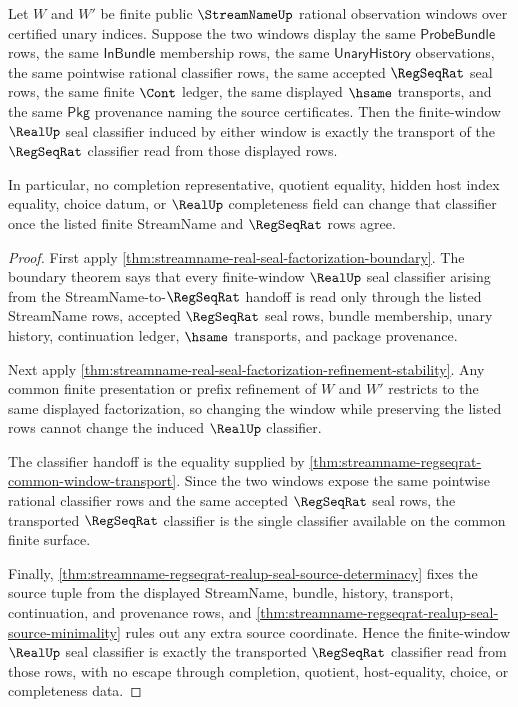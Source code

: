 \begin{theorem}
\label{thm:streamname-real-seal-finite-window-classifier-exactness}
Let $W$ and $W'$ be finite public $\StreamNameUp$ rational observation windows
over certified unary indices. Suppose the two windows display the same
$\mathsf{ProbeBundle}$ rows, the same $\mathsf{InBundle}$ membership rows, the
same $\mathsf{UnaryHistory}$ observations, the same pointwise rational
classifier rows, the same accepted $\RegSeqRat$ seal rows, the same finite
$\Cont$ ledger, the same displayed $\hsame$ transports, and the same
$\mathsf{Pkg}$ provenance naming the source certificates. Then the
finite-window $\RealUp$ seal classifier induced by either window is exactly the
transport of the $\RegSeqRat$ classifier read from those displayed rows.

In particular, no completion representative, quotient equality, hidden host
index equality, choice datum, or $\RealUp$ completeness field can change that
classifier once the listed finite StreamName and $\RegSeqRat$ rows agree.
\end{theorem}
\begin{proof}
First apply
\autoref{thm:streamname-real-seal-factorization-boundary}. The boundary
theorem says that every finite-window $\RealUp$ seal classifier arising from
the StreamName-to-$\RegSeqRat$ handoff is read only through the listed
StreamName rows, accepted $\RegSeqRat$ seal rows, bundle membership, unary
history, continuation ledger, $\hsame$ transports, and package provenance.

Next apply
\autoref{thm:streamname-real-seal-factorization-refinement-stability}. Any
common finite presentation or prefix refinement of $W$ and $W'$ restricts to
the same displayed factorization, so changing the window while preserving the
listed rows cannot change the induced $\RealUp$ classifier.

The classifier handoff is the equality supplied by
\autoref{thm:streamname-regseqrat-common-window-transport}. Since the two
windows expose the same pointwise rational classifier rows and the same
accepted $\RegSeqRat$ seal rows, the transported $\RegSeqRat$ classifier is the
single classifier available on the common finite surface.

Finally,
\autoref{thm:streamname-regseqrat-realup-seal-source-determinacy} fixes the
source tuple from the displayed StreamName, bundle, history, transport,
continuation, and provenance rows, and
\autoref{thm:streamname-regseqrat-realup-seal-source-minimality} rules out any
extra source coordinate. Hence the finite-window $\RealUp$ seal classifier is
exactly the transported $\RegSeqRat$ classifier read from those rows, with no
escape through completion, quotient, host-equality, choice, or completeness
data.
\end{proof}
